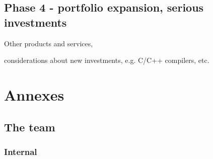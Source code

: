 \documentclass[a4paper,twoside,15pt]{book}
\begin{document}
	\section{Phase 4 - portfolio expansion, serious investments}
		\begin{dinglist}{73}
			\item Other products and services,
			\item considerations about new investments, e.g. C/C++ compilers, etc.
		\end{dinglist}

\chapter{Annexes}
	\section{The team}
		\subsection{Internal}
\end{document}
